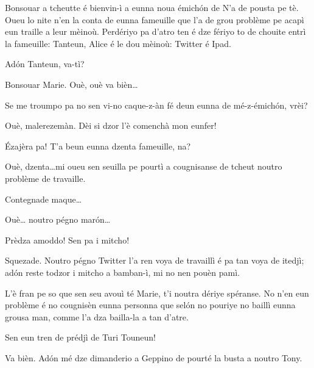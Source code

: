 \begin{drama}
\Mariespeaks Bonsouar a tcheutte é bienvin-ì a eunna nou\-a émich\'on de \og N’a de pousta pe tè\fg. Oueu lo nite n'en la conta de eunna fameuille que l’a de grou problème pe acapì eun traille a leur mèinoù. Perdériyo pa d'atro ten é dze fériyo to de chouite entrì la fameuille: Tanteun, Alice é le dou mèinoù: Twitter é Ipad.


\Mariespeaks Ad\'on Tanteun, va-tì?

\Tanteunspeaks{} Bonsouar Marie. Ouè, ouè va bièn\ldots

\Mariespeaks Se me troumpo pa no sen vi-no caque-z-àn fé deun eunna de mé-z-émich\'on, vrèi?

\Tanteunspeaks{} Ouè,  malerezemàn. Dèi si dzor l’è comenchà mon eunfer!

\Mariespeaks \'Ezajèra pa! T’a beun eunna dzenta fa\-meu\-ille, na?

\Tanteunspeaks Ouè, dzenta\ldots mi oueu sen seuilla pe pourtì a cougnisanse de tcheut noutro problème de travaille.

\Mariespeaks Contegnade maque\ldots

\Tanteunspeaks Ouè\ldots {} noutro pégno mar\'on\ldots


\Alicespeaks Prèdza amoddo! Sen pa i mitcho!

\Tanteunspeaks Squezade. Noutro pégno Twitter l’a ren voya de travaillì é pa tan voya de itedjì; ad\'on reste todzor i mitcho a bamban-ì, mi no nen pouèn pamì.

\Alicespeaks L’è fran pe so que sen seu avouì té Marie, t’i noutra dériye spéranse. No n'en eun problème é no cougnisèn eunna personna que sel\'on no pouriye no baillì eunna grousa man, com\-me  l’a dza bailla-la a tan d’atre.

\Twitterspeaks{} Sen eun tren de prédjì de Turi Touneun!

\Mariespeaks Va bièn. Ad\'on mé dze dimanderio a Geppino de pourté la busta a noutro Tony.



\end{drama}
